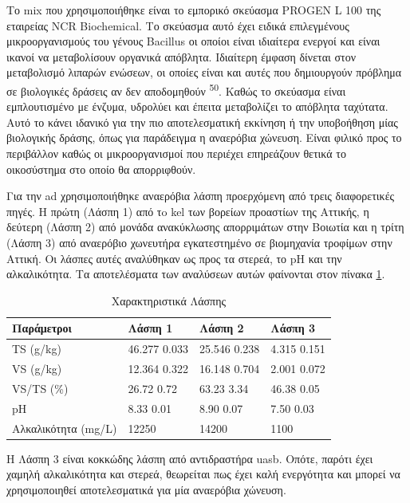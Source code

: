 \documentclass[11pt]{report}
\makeatletter
\newcommand{\citeprocitem}[2]{\hyper@linkstart{cite}{citeproc_bib_item_#1}#2\hyper@linkend}
\makeatother
\begin{document}
Το \acrfull{mix} που χρησιμοποιήθηκε είναι το εμπορικό σκεύασμα PROGEN L 100 της εταιρείας NCR Biochemical. Το σκεύασμα αυτό έχει ειδικά επιλεγμένους μικροοργανισμούς του γένους Bacillus οι οποίοι είναι ιδιαίτερα ενεργοί και είναι ικανοί να μεταβολίσουν οργανικά απόβλητα. Ιδιαίτερη έμφαση δίνεται στον μεταβολισμό λιπαρών ενώσεων, οι οποίες είναι και αυτές που δημιουργούν πρόβλημα σε βιολογικές δράσεις αν δεν αποδομηθούν \textsuperscript{\citeprocitem{50}{50}}. Καθώς το σκεύασμα είναι εμπλουτισμένο με ένζυμα, υδρολύει και έπειτα μεταβολίζει το απόβλητα ταχύτατα. Αυτό το κάνει ιδανικό για την πιο αποτελεσματική εκκίνηση ή την υποβοήθηση μίας βιολογικής δράσης, όπως για παράδειγμα η αναερόβια χώνευση. Είναι φιλικό προς το περιβάλλον καθώς οι μικροοργανισμοί που περιέχει επηρεάζουν θετικά το οικοσύστημα στο οποίο θα απορριφθούν.

Για την \acrshort{ad} χρησιμοποιήθηκε αναερόβια λάσπη προερχόμενη από τρεις διαφορετικές πηγές. Η πρώτη (Λάσπη 1) από τo \acrfull{kel} των βορείων προαστίων της Αττικής, η δεύτερη (Λάσπη 2) από μονάδα ανακύκλωσης απορριμάτων στην Βοιωτία και η τρίτη (Λάσπη 3) από αναερόβιο χωνευτήρα εγκατεστημένο σε βιομηχανία τροφίμων στην Αττική. Οι λάσπες αυτές αναλύθηκαν ως προς τα στερεά, το pH και την αλκαλικότητα. Τα αποτελέσματα των αναλύσεων αυτών φαίνονται στον πίνακα \ref{tab:org6629fd3}. 

\begin{table}[htbp]
\caption{\label{tab:org6629fd3}Χαρακτηριστικά Λάσπης}
\centering
\begin{tabular}{llll}
Παράμετροι & Λάσπη 1 & Λάσπη 2 & Λάσπη 3\\[0pt]
\hline
TS (g/kg) & 46.277 \textpm{} 0.033 & 25.546 \textpm{} 0.238 & 4.315 \textpm{} 0.151\\[0pt]
VS (g/kg) & 12.364 \textpm{} 0.322 & 16.148 \textpm{} 0.704 & 2.001 \textpm{} 0.072\\[0pt]
VS/TS (\%) & 26.72 \textpm{} 0.72 & 63.23 \textpm{} 3.34 & 46.38 \textpm{} 0.05\\[0pt]
pH & 8.33 \textpm{} 0.01 & 8.90 \textpm{} 0.07 & 7.50 \textpm{} 0.03\\[0pt]
Αλκαλικότητα (mg/L) & 12250 & 14200 & 1100\\[0pt]
\end{tabular}
\end{table}

Η Λάσπη 3 είναι κοκκώδης λάσπη από αντιδραστήρα \acrshort{uasb}. Οπότε, παρότι έχει χαμηλή αλκαλικότητα και στερεά, θεωρείται πως έχει καλή ενεργότητα και μπορεί να χρησιμοποιηθεί αποτελεσματικά για μία αναερόβια χώνευση.
\end{document}
